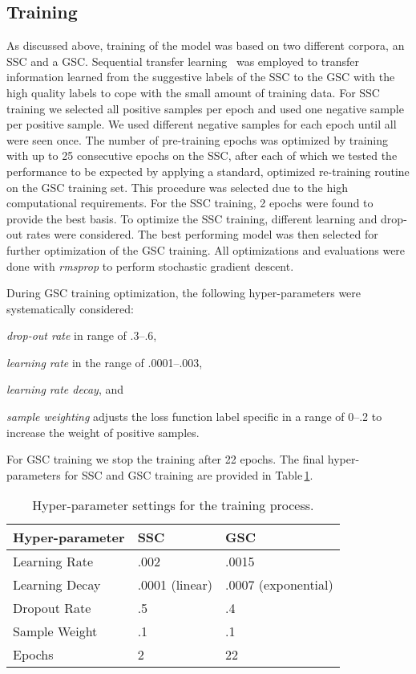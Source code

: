 \documentclass[runningheads]{llncs}
\newcommand{\tabref}[1]{Table\,\ref{#1}}
\begin{document}
\subsection{Training}
As discussed above, training of the model was based on two different corpora, an SSC and a GSC.
Sequential transfer learning~\cite{ruder2019neural} was employed to transfer information learned from the suggestive labels of the SSC to the GSC with the high quality labels to cope with the small amount of training data.
For SSC training we selected all positive samples per epoch and used one negative sample per positive sample. 
We used different negative samples for each epoch until all were seen once. 
The number of pre-training epochs was optimized by training with up to 25 consecutive epochs on the SSC, after each of which we tested the performance to be expected by applying a standard, optimized re-training routine on the GSC training set. 
This procedure was selected due to the high computational requirements.
For the SSC training, 2 epochs were found to provide the best basis.
To optimize the SSC training, different learning and drop-out rates were considered.
The best performing model was then selected for further optimization of the GSC training.
All optimizations and evaluations were done with \textit{rmsprop} to perform stochastic gradient descent. 

During GSC training optimization, the following hyper-parameters were systematically considered:
\begin{inparaenum}[1.)]
    \item \textit{drop-out rate} in range of .3--.6,
    \item \textit{learning rate} in the range of .0001--.003,
    \item \textit{learning rate decay}, and 
    \item \textit{sample weighting} adjusts the loss function label specific in a range of 0--.2 to increase the weight of positive samples.
\end{inparaenum}
For GSC training we stop the training after 22 epochs.
The final hyper-parameters for SSC and GSC training are provided in \tabref{tab:training_config}.
\begin{table}[tb]
    \caption{Hyper-parameter settings for the training process.}
    \label{tab:training_config}
    \centering
    \begin{tabularx}{.8\textwidth}{p{3cm}XX}
        \toprule
         Hyper-parameter & SSC & GSC \\
        \midrule
        Learning Rate & .002  & .0015\\
        Learning Decay & .0001 (linear) & .0007 (exponential)\\
        Dropout Rate & .5 & .4 \\
        Sample Weight & .1 & .1\\
        Epochs & 2 & 22 \\
        \bottomrule
    \end{tabularx}
\end{table}
\end{document}
